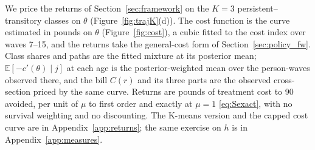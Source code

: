 \documentclass[11pt]{article}
\newcommand{\E}{\mathbb{E}}
\begin{document}
	We price the returns of Section~\ref{sec:framework} on the $K=3$ persistent--transitory classes on $\theta$ (Figure~\ref{fig:trajK}(d)). The cost function is the curve estimated in pounds on $\theta$ (Figure~\ref{fig:cost}), a cubic fitted to the cost index over waves 7--15, and the returns take the general-cost form of Section~\ref{sec:policy_fw}. Class shares and paths are the fitted mixture at its posterior mean; $\E[-c'(\theta)\mid j]$ at each age is the posterior-weighted mean over the person-waves observed there, and the bill $C(r)$ and its three parts are the observed cross-section priced by the same curve. Returns are pounds of treatment cost to 90 avoided, per unit of $\mu$ to first order and exactly at $\mu=1$ \eqref{eq:Sexact}, with no survival weighting and no discounting. The K-means version and the capped cost curve are in Appendix~\ref{app:returns}; the same exercise on $h$ is in Appendix~\ref{app:measures}.
	
\end{document}
